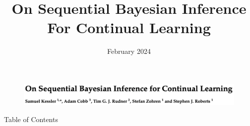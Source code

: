 \documentclass[12pt,aspectratio=169, handout]{beamer}
\begin{document}
  
	\title{On Sequential Bayesian Inference For Continual Learning}
	\date{February 2024}
 
\begin{frame}[plain]
    \begin{figure}
		\centering
		\includegraphics[width=\textwidth]{"images/title.png"}
	\end{figure}

\end{frame}


\begin{frame}{Table of Contents}
    \tableofcontents
\end{frame}

\end{document}
